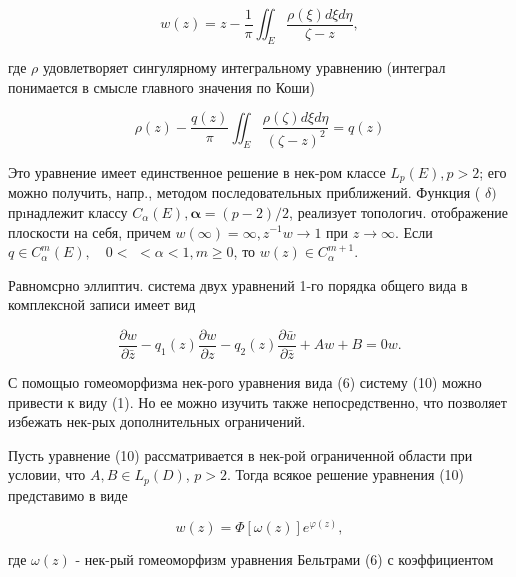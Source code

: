 \documentclass[10pt]{article}
\begin{document}
\[

w(z)=z-\frac{1}{\pi} \iint_{E} \frac{\rho(\xi) d \xi d \eta}{\zeta-z},

\]



где $\rho$ удовлетворяет сингулярному интегральному уравнению (интеграл понимается в смысле главного значения по Коши)



\[

\rho(z)-\frac{q(z)}{\pi} \iint_{E} \frac{\rho(\zeta) d \xi d \eta}{(\zeta-z)^{2}}=q(z)

\]



Это уравнение имеет единственное решение в нек-ром классе $L_{p}(E), p>2$; его можно получить, напр., методом последовательных приближений. Функция ( $\delta)$ прıнадлежит классу $C_{\alpha}(E), \boldsymbol{\alpha}=(p-2) / 2$, реализует топологич. отображение плоскости на себя, причем $w(\infty)=\infty, z^{-1} w \rightarrow 1$ при $z \rightarrow \infty$. Если $q \in C_{\alpha}^{m}(E), \quad 0<$ $<\alpha<1, m \geqslant 0$, то $w(z) \in C_{\alpha}^{m+1}$.



Равномсрно эллиптич. система двух уравнений 1-го порядка общего вида в комплексной записи имеет вид



\[

\frac{\partial w}{\partial \bar{z}}-q_{1}(z) \frac{\partial w}{\partial z}-q_{2}(z) \frac{\partial \bar{w}}{\partial \bar{z}}+A w+B=0 w .

\]



С помощыо гомеоморфизма нек-рого уравнения вида (6) систему (10) можно привести к виду (1). Но ее можно изучить также непосредственно, что позволяет избежать нек-рых дополнительных ограничений.



Пусть уравнение (10) рассматривается в нек-рой ограниченной области при условии, что $A, B \in L_{p}(D)$, $p>2$. Тогда всякое решение уравнения (10) представимо в виде



\[

w(z)=\Phi[\omega(z)] e^{\varphi(z)},

\]



где $\omega(z)$ - нек-рый гомеоморфизм уравнения Бельтрами (6) с коэффициентом
\end{document}
